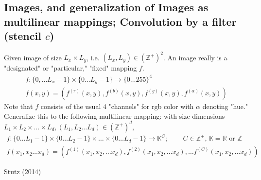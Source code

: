 \documentclass[10pt]{amsart}
\begin{document}
\begin{multicols*}{2}
\section{Images, and generalization of Images as multilinear mappings; Convolution by a filter (stencil $c$)}
Given image of size $L_x \times L_y$, i.e. $(L_x,L_y)\in ( \mathbb{Z}^+)^2$.  An image really is a "designated" or "particular," "fixed" mapping $f$.  
\[
\begin{gathered}
f: \lbrace 0 , \dots L_x- 1\rbrace \times \lbrace 0 \dots L_y-1 \rbrace \to \lbrace 0 \dots 255 \rbrace^4 \\ 
f(x,y) = (f^{(r)}(x,y), f^{(b)}(x,y), f^{(g)}(x,y), f^{(\alpha)}(x,y))
\end{gathered}
\]
Note that $f$ consists of the usual 4 "channels" for rgb color with $\alpha$ denoting "hue."  
Generalize this to the following multilinear mapping:  
with size dimensions $L_1 \times L_2 \times \dots \times L_d, (L_1, L_2 \dots L_d)\in (\mathbb{Z}^+)^d$, 
\begin{equation}
\begin{gathered}
f: \lbrace 0 \dots L_1 - 1 \rbrace \times  \lbrace 0 \dots L_2 - 1 \rbrace \times \dots \times  \lbrace 0 \dots L_d - 1 \rbrace \to \mathbb{K}^C ; \qquad \, C\in \mathbb{Z}^+ , \, \mathbb{K} = \mathbb{R} \text{ or } \mathbb{Z} \\ 
f(x_1,x_2 \dots x_d) = (f^{(1)}(x_1,x_2,\dots x_d), f^{(2)}(x_1,x_2,\dots x_d), \dots f^{(C)}(x_1,x_2,\dots x_d) )
\end{gathered}
\end{equation}   


 Stutz (2014) \cite{Stut2014}





\end{multicols*}
\end{document}
